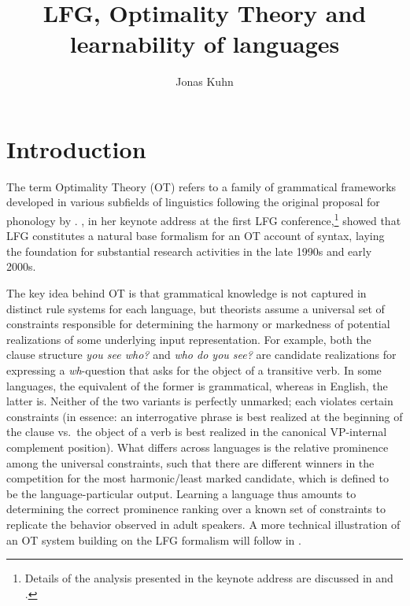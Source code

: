 \documentclass[output=paper,hidelinks]{langscibook}
\title{LFG, Optimality Theory and learnability of languages}
\author{Jonas Kuhn\affiliation{University of Stuttgart}}
\begin{document}
\maketitle
\label{chap:OT}

\section{Introduction} 
\label{sec:OT:intro}

The term Optimality Theory (OT) refers to a family of grammatical frameworks developed in various subfields of linguistics following the original proposal for phonology by \citet{PrinceSmolensky1993}. %
\citet{Bresnan-96-LFG-conference}, in her keynote address at the first LFG conference,\footnote{Details of the analysis presented in the keynote address are discussed in \citet{Bresnan-Explaining-Morphosyntactic} and \citet{Bresnan-Lexicon-in-OT}.} showed that LFG constitutes a natural base formalism for an OT account of syntax, laying the foundation for substantial research activities in the late 1990s and early 2000s.

The key idea behind OT is that grammatical knowledge is not captured in distinct rule systems for each language, but theorists assume a universal set of constraints responsible for determining the harmony or markedness of potential realizations of some underlying input representation. For example, both the clause structure \emph{you see who?} and \emph{who do you see?} are candidate realizations for expressing a \emph{wh}-question that asks for the object of a transitive verb. In some languages, the equivalent of the former is grammatical, whereas in English, the latter is. Neither of the two variants is perfectly unmarked; each violates certain constraints (in essence: an interrogative phrase is best realized at the beginning of the clause vs.\ the object of a verb is best realized in the canonical VP-internal complement position).
What differs across languages is the relative prominence among the universal constraints, such that there are different winners in the competition for the most harmonic/least marked candidate, which is defined to be the language-particular output. Learning a language thus amounts to determining the correct prominence ranking over a known set of constraints to replicate the behavior observed in adult speakers. A more technical illustration of an OT system building on the LFG formalism will follow in .
\end{document}
